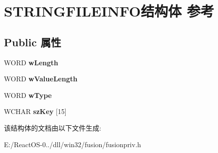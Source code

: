 \hypertarget{struct_s_t_r_i_n_g_f_i_l_e_i_n_f_o}{}\section{S\+T\+R\+I\+N\+G\+F\+I\+L\+E\+I\+N\+F\+O结构体 参考}
\label{struct_s_t_r_i_n_g_f_i_l_e_i_n_f_o}
\subsection*{Public 属性}
\begin{DoxyCompactItemize}
\item 
\mbox{\label{struct_s_t_r_i_n_g_f_i_l_e_i_n_f_o_a649e091719b337271c465fb4b31434ff}} 
W\+O\+RD {\bfseries w\+Length}
\item 
\mbox{\label{struct_s_t_r_i_n_g_f_i_l_e_i_n_f_o_a8c0ca4cd97ea38175ad95306f3dd71e8}} 
W\+O\+RD {\bfseries w\+Value\+Length}
\item 
\mbox{\label{struct_s_t_r_i_n_g_f_i_l_e_i_n_f_o_a408ab718a9e94a5f6e39a6140bd74e5a}} 
W\+O\+RD {\bfseries w\+Type}
\item 
\mbox{\label{struct_s_t_r_i_n_g_f_i_l_e_i_n_f_o_a19f34df09869115e96d626143ba86b80}} 
W\+C\+H\+AR {\bfseries sz\+Key} \mbox{[}15\mbox{]}
\end{DoxyCompactItemize}


该结构体的文档由以下文件生成\+:\begin{DoxyCompactItemize}
\item 
E\+:/\+React\+O\+S-\/0../dll/win32/fusion/fusionpriv.\+h\end{DoxyCompactItemize}
